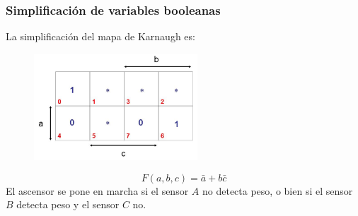 \documentclass{beamer}
\begin{document}
\begin{frame}
\frametitle{Simplificaci\'on de variables booleanas}
La simplificaci\'on del mapa de Karnaugh es:
 \begin{figure}[h]
  \label{fig:volumen}
\centering
\includegraphics[height=4cm]{k11}
\end{figure}
\[F(a,b,c) = \bar a + b\bar c\]
El ascensor se pone en marcha si el sensor $A$ no detecta peso, o bien si el sensor $B$ detecta peso y el sensor $C$ no. 
\end{frame}


\end{document}
